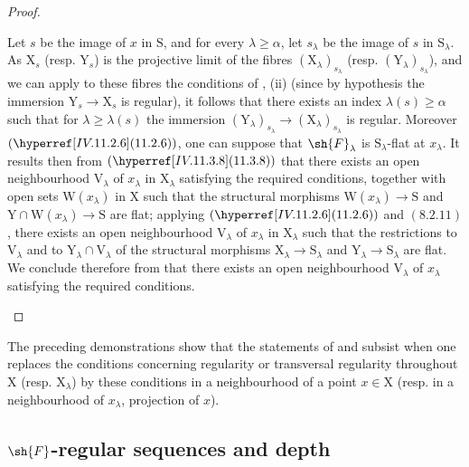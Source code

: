 \begin{proof}
\begin{enumerate}
Let $s$ be the image of $x$ in $\mathrm{S}$, and for every $\lambda\geqslant\alpha$, let $s_\lambda$ be the image of $s$ in $\mathrm{S}_\lambda$. As $\mathrm{X}_s$ (resp. $\mathrm{Y}_s$) is the projective limit of the fibres $(\mathrm{X}_\lambda)_{s_\lambda}$ (resp. $(\mathrm{Y}_\lambda)_{s_\lambda}$), and we can apply to these fibres the conditions of , (ii) (since by hypothesis the immersion $\mathrm{Y}_s\to\mathrm{X}_s$ is regular), it follows that there exists an index $\lambda(s)\geqslant\alpha$ such that for $\lambda\geqslant\lambda(s)$ the immersion $(\mathrm{Y}_\lambda)_{s_\lambda}\to(\mathrm{X}_\lambda)_{s_\lambda}$ is regular. Moreover $(\sref{IV.11.2.6})$, one can suppose that $\sh{F}_\lambda$ is $\mathrm{S}_\lambda$-flat at $x_\lambda$. It results then from $(\sref{IV.11.3.8})$ that there exists an open neighbourhood $\mathrm{V}_\lambda$ of $x_\lambda$ in $\mathrm{X}_\lambda$ satisfying the required conditions, together with open sets $\mathrm{W}(x_\lambda)$ in $\mathrm{X}$ such that the structural morphisms $\mathrm{W}(x_\lambda)\to\mathrm{S}$ and $\mathrm{Y}\cap\mathrm{W}(x_\lambda)\to\mathrm{S}$ are flat; applying $(\sref{IV.11.2.6})$ and $(8.2.11)$, there exists an open neighbourhood $\mathrm{V}_\lambda$ of $x_\lambda$ in $\mathrm{X}_\lambda$ such that the restrictions to $\mathrm{V}_\lambda$ and to $\mathrm{Y}_\lambda\cap\mathrm{V}_\lambda$ of the structural morphisms $\mathrm{X}_\lambda\to\mathrm{S}_\lambda$ and $\mathrm{Y}_\lambda\to\mathrm{S}_\lambda$ are flat. We conclude therefore from  that there exists an open neighbourhood $\mathrm{V}_\lambda$ of $x_\lambda$ satisfying the required conditions.
\end{enumerate}
\end{proof}

\begin{remark}[19.8.3]
\label{IV.19.8.3}
The preceding demonstrations show that the statements of  and  subsist when one replaces the conditions concerning regularity or transversal regularity throughout $\mathrm{X}$ (resp. $\mathrm{X}_\lambda$) by these conditions in a neighbourhood of a point $x\in\mathrm{X}$ (resp. in a neighbourhood of $x_\lambda$, projection of $x$).
\end{remark}

\subsection{\texorpdfstring{$\sh{F}$}{F}-regular sequences and depth}
\label{subsection:IV.19.9}

